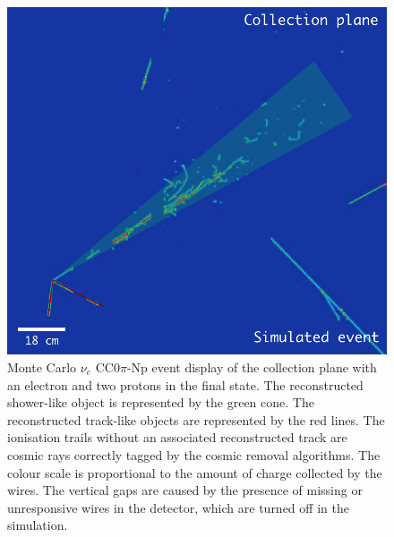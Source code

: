 \begin{figure}[htbp]
	\begin{center}
    	\includegraphics[width=0.85\linewidth]{figures/evd.png}
    	\caption{Monte Carlo $\nu_{e}$ CC0$\pi$-Np event display of the collection plane with an electron and two protons in the final state. The reconstructed shower-like object is represented by the green cone. The reconstructed track-like objects are represented by the red lines. The ionisation trails without an associated reconstructed track are cosmic rays correctly tagged by the cosmic removal algorithms. The colour scale is proportional to the amount of charge collected by the wires. {The vertical gaps are caused by the presence of missing or unresponsive wires in the detector, which are turned off in the simulation.}} \label{fig:evd}
	\end{center}
\end{figure}


